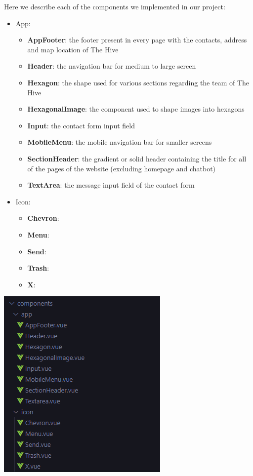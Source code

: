 Here we describe each of the components we implemented in our project:
\begin{itemize}
    \item App:
    \begin{itemize}
        \item \textbf{AppFooter}: the footer present in every page with the contacts, address and map location of The Hive
        \item \textbf{Header}: the navigation bar for medium to large screen
        \item \textbf{Hexagon}: the shape used for various sections regarding the team of The Hive
        \item \textbf{HexagonalImage}: the component used to shape images into hexagons
        \item \textbf{Input}: the contact form input field
        \item \textbf{MobileMenu}: the mobile navigation bar for smaller screens
        \item \textbf{SectionHeader}: the gradient or solid header containing the title for all of the pages of the website (excluding homepage and chatbot)
        \item \textbf{TextArea}: the message input field of the contact form 
    \end{itemize}

    \item Icon:
    \begin{itemize}
        \item \textbf{Chevron}:
        \item \textbf{Menu}:
        \item \textbf{Send}:
        \item \textbf{Trash}:
        \item \textbf{X}:
    \end{itemize}
\end{itemize}


\begin{center}
    \includegraphics[width=0.25\linewidth]{img/components-structure.png} 
\end{center}


